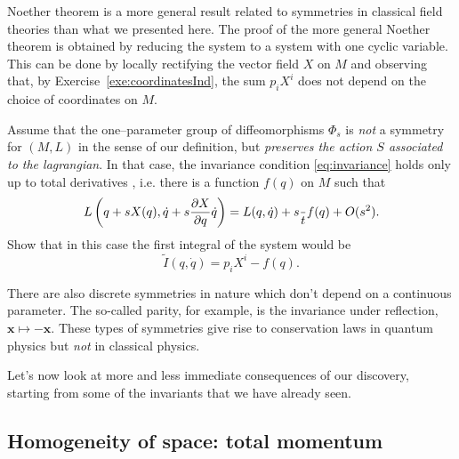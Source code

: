 \documentclass[english,fontsize=11pt,paper=a5,oneside]{scrbook}
\newcommand{\bx}{\bm{x}}
\let\d\relax
\DeclareMathOperator{\d}{d}
\theoremstyle{definition}
\newenvironment{remark}
  {\pushQED{\qed}\renewcommand{\qedsymbol}{$\lozenge$}\remarkx}
  {\popQED\endremarkx}
\newenvironment{exercise}
  {\pushQED{\qed}\renewcommand{\qedsymbol}{$\maltese$}\exercisex}
  {\popQED\endexercisex}
\begin{document}
\begin{remark}
    Noether theorem is a more general result related to symmetries in classical field theories than what we presented here.
    The proof of the more general Noether theorem is obtained by reducing the system to a system with one cyclic variable.
    This can be done by locally rectifying the vector field $X$ on $M$ and observing that, by Exercise~\ref{exe:coordinatesInd}, the sum $p_i X^i$ does not depend on the choice of coordinates on $M$.
\end{remark}

\begin{exercise}
    Assume that the one--parameter group of diffeomorphisms $\Phi_s$ is \emph{not} a symmetry for $(M,L)$ in the sense of our definition, but \emph{preserves the action $S$ associated to the lagrangian}.
    In that case, the invariance condition \eqref{eq:invariance} holds only up to total derivatives \cite[Chapter 4.20]{book:gelfand}, i.e. there is a function $f(q)$ on $M$ such that
    \begin{equation}
        L\left( q + s X(q), \dot q + s \frac{\partial X}{\partial q} \dot q\right)
        = L(q, \dot q) + s \frac{\d}{\d t}f(q) + O(s^2).
    \end{equation}
    Show that in this case the first integral of the system would be
    \begin{equation}
        \tilde I(q, \dot q) = p_i X^i - f(q).
    \end{equation}
\end{exercise}

\begin{remark}
    There are also discrete symmetries in nature which don't depend on a continuous parameter. The so-called parity, for example, is the invariance under reflection, $\bx \mapsto -\bx$.
    These types of symmetries give rise to conservation laws in quantum physics but \emph{not} in classical physics.
\end{remark}

Let's now look at more and less immediate consequences of our discovery, starting from some of the invariants that we have already seen.

\subsection{Homogeneity of space: total momentum}
\end{document}
